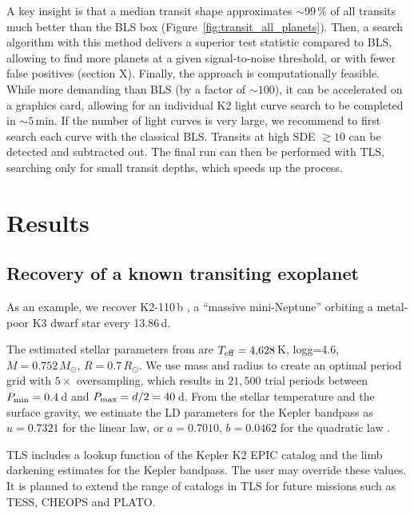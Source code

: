 \documentclass[twocolumn,tighten,longauthor]{myaastex62}
\begin{document}
A key insight is that a median transit shape approximates $\sim99\,$\% of all transits much better than the BLS box (Figure~\ref{fig:transit_all_planets}). Then, a search algorithm with this method delivers a superior test statistic compared to BLS, allowing to find more planets at a given signal-to-noise threshold, or with fewer false positives (section X). Finally, the approach is computationally feasible. While more demanding than BLS (by a factor of $\sim100$), it can be accelerated on a graphics card, allowing for an individual K2 light curve search to be completed in $\sim5$\,min. If the number of light curves is very large, we recommend to first search each curve with the classical BLS. Transits at high SDE $\gtrsim10$ can be detected and subtracted out. The final run can then be performed with TLS, searching only for small transit depths, which speeds up the process.













\section{Results}


\subsection{Recovery of a known transiting exoplanet}
As an example, we recover K2-110\,b \citep[EPIC212521166b,][]{2017A&A...604A..19O}, a ``massive mini-Neptune'' orbiting a metal-poor K3 dwarf star every 13.86\,d.

The estimated stellar parameters from \citet{2016ApJS..224....2H} are $T_{\rm eff}=4{,}628\,$K, logg=4.6, $M=0.752\,M_{\odot}$, $R=0.7\,R_{\odot}$. We use mass and radius to create an optimal period grid with $5\times$ oversampling, which results in $21{,}500$ trial periods between $P_{\rm min}=0.4\,$d and $P_{\rm max}=d/2=40\,$d. From the stellar temperature and the surface gravity, we estimate the LD parameters for the Kepler bandpass as $u=0.7321$ for the linear law, or $a=0.7010$, $b=0.0462$ for the quadratic law \citep{2012A&A...546A..14C}. 

TLS includes a lookup function of the Kepler K2 EPIC catalog and the limb darkening estimates for the Kepler bandpass. The user may override these values. It is planned to extend the range of catalogs in TLS for future missions such as TESS, CHEOPS and PLATO.
\end{document}
